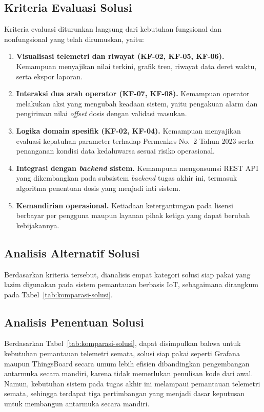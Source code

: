 \subsection{Kriteria Evaluasi Solusi}
Kriteria evaluasi diturunkan langsung dari kebutuhan fungsional dan nonfungsional yang telah dirumuskan, yaitu:
\begin{enumerate}
    \item \textbf{Visualisasi telemetri dan riwayat (KF-02, KF-05, KF-06).} Kemampuan menyajikan nilai terkini, 
    grafik tren, riwayat data deret waktu, serta ekspor laporan.
    
    \item \textbf{Interaksi dua arah operator (KF-07, KF-08).} Kemampuan operator melakukan aksi yang mengubah 
    keadaan sistem, yaitu pengakuan alarm dan pengiriman nilai \textit{offset} dosis dengan validasi masukan.
    
    \item \textbf{Logika domain spesifik (KF-02, KF-04).} Kemampuan menyajikan evaluasi kepatuhan parameter 
    terhadap Permenkes No.~2 Tahun 2023 serta penanganan kondisi data kedaluwarsa sesuai risiko operasional.
    
    \item \textbf{Integrasi dengan \textit{backend} sistem.} Kemampuan mengonsumsi REST API yang dikembangkan 
    pada subsistem \textit{backend} tugas akhir ini, termasuk algoritma penentuan dosis yang menjadi inti sistem.
    
    \item \textbf{Kemandirian operasional.} Ketiadaan ketergantungan pada lisensi berbayar per pengguna maupun 
    layanan pihak ketiga yang dapat berubah kebijakannya.
\end{enumerate}

\subsection{Analisis Alternatif Solusi}
Berdasarkan kriteria tersebut, dianalisis empat kategori solusi siap pakai yang lazim digunakan pada sistem
pemantauan berbasis IoT, sebagaimana dirangkum pada Tabel~\ref{tab:komparasi-solusi}.



\subsection{Analisis Penentuan Solusi}
Berdasarkan Tabel~\ref{tab:komparasi-solusi}, dapat disimpulkan bahwa untuk kebutuhan pemantauan telemetri 
semata, solusi siap pakai seperti Grafana maupun ThingsBoard secara umum lebih efisien dibandingkan pengembangan 
antarmuka secara mandiri, karena tidak memerlukan penulisan kode dari awal. Namun, kebutuhan sistem pada tugas 
akhir ini melampaui pemantauan telemetri semata, sehingga terdapat tiga pertimbangan yang menjadi dasar keputusan 
untuk membangun antarmuka secara mandiri.

